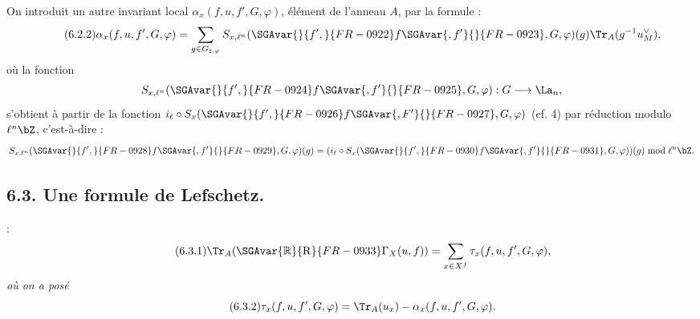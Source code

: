 On introduit un autre invariant local $\alpha_x(f,u,f',G,\varphi)$, élément de l'anneau $A$, par la formule :
\begin{equation}\tag{6.2.2}
\alpha_x(f,u,f',G,\varphi)=
\sum_{g\in G_{\natural,\varphi}}
S_{x,\ell^n}(\SGAvar{}{f',}{FR-0922}f\SGAvar{,f'}{}{FR-0923},G,\varphi)(g)\Tr_A(g^{-1}u_M^\vee),
\end{equation}
où la fonction
\[
S_{x,\ell^n}(\SGAvar{}{f',}{FR-0924}f\SGAvar{,f'}{}{FR-0925},G,\varphi):G\longrightarrow\La_n,
\]
s'obtient à partir de la fonction $i_\ell\circ S_x(\SGAvar{}{f',}{FR-0926}f\SGAvar{,F'}{}{FR-0927},G,\varphi)$ (cf. 4) par réduction modulo $\ell^n\bZ$, c'est-à-dire :\[
S_{x,\ell^n}(\SGAvar{}{f',}{FR-0928}f\SGAvar{,f'}{}{FR-0929},G,\varphi)(g)=
(i_\ell\circ S_x(\SGAvar{}{f',}{FR-0930}f\SGAvar{,f'}{}{FR-0931},G,\varphi))(g)\bmod \ell^n\bZ.
\]

\subsection*{6.3. Une formule de Lefschetz.}
 :
\begin{equation}
\tag{6.3.1}
\Tr_A(\SGAvar{\mathbb{R}}{\mathrm{R}}{FR-0933}\Gamma_X(u,f))=\sum_{x\in X^f}\tau_x(f,u,f',G,\varphi),
\end{equation}
\emph{où on a posé}
\begin{equation}
\tag{6.3.2}
\tau_x(f,u,f',G,\varphi)=\Tr_A(u_x)-\alpha_x(f,u,f',G,\varphi).
\end{equation}


